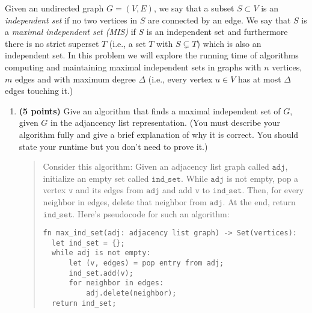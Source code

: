 \documentclass[11pt]{article}
\begin{document}
\begin{enumerate}
Given an undirected graph $G = (V,E)$, we say that a subset $S\subset V$ is an \emph{independent set} if no two vertices in $S$ are connected by an edge. We say that $S$ is a \emph{maximal independent set (MIS)} if $S$ is an independent set and furthermore there is no strict superset $T$ (i.e., a set $T$ with $S \subsetneq T$) which is also an independent set. In this problem we will explore the running time of algorithms computing and maintaining maximal independent sets in graphs with $n$ vertices, $m$ edges and with maximum degree $\Delta$ (i.e., every vertex $u \in V$ has at most $\Delta$ edges touching it.) 



\begin{enumerate}
    \item {\bf (5 points)} Give an algorithm that finds a maximal independent set of $G$, given $G$ in the adjancency list representation. (You must describe your algorithm fully and give a brief explanation of why it is correct. You should state your runtime but you don't need to prove it.) 
    \begin{quote}
      \color{purple}
      Consider this algorithm: Given an adjacency list graph called $\texttt{adj}$, initialize an empty set called $\texttt{ind\_set}$. While $\texttt{adj}$ is not empty, pop a vertex $\texttt{v}$ and its edges from $\texttt{adj}$ and add $\texttt{v}$ to $\texttt{ind\_set}$. Then, for every neighbor in edges, delete that neighbor from $\texttt{adj}$. At the end, return $\texttt{ind\_set}$. Here's pseudocode for such an algorithm:
      \begin{verbatim}
fn max_ind_set(adj: adjacency list graph) -> Set(vertices):
  let ind_set = {};
  while adj is not empty:
      let (v, edges) = pop entry from adj;
      ind_set.add(v);
      for neighbor in edges:
          adj.delete(neighbor);
  return ind_set;
      \end{verbatim}
      

\end{quote}
\end{enumerate}
\end{enumerate}
\end{document}
